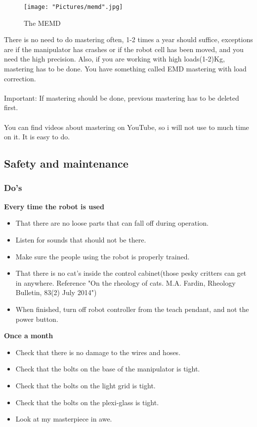 \documentclass{article}
\begin{document}
        \begin{figure}[!h]
            \centering
            \texttt{[image: "Pictures/memd".jpg]}
            \caption{The MEMD}
        \end{figure}
        
        There is no need to do mastering often, 1-2 times a year should suffice, exceptions are if the manipulator has crashes or if the robot cell has been moved, and you need the high precision. Also, if you are working with high loads(1-2)Kg, mastering has to be done. You have something called EMD mastering with load correction. 
        \\\\
        Important: If mastering should be done, previous mastering has to be deleted first. 
        \\\\
        You can find videos about mastering on YouTube, so i will not use to much time on it. It is easy to do. 
        
        \newpage

    \subsection{Safety and maintenance}
        \subsubsection{Do's }
        \textbf{Every time the robot is used}
        \begin{itemize}
            \item That there are no loose parts that can fall off during operation.
            \item Listen for sounds that should not be there.
            \item Make sure the people using the robot is properly trained.
            \item That there is no cat's inside the control cabinet(those pesky critters can get in anywhere. Reference "On the rheology of cats. M.A. Fardin, Rheology Bulletin, 83(2) July 2014")
            \item When finished, turn off robot controller from the teach pendant, and not the power button.
        \end{itemize}
        
        \textbf{Once a month}
        \begin{itemize}
            \item Check that there is no damage to the wires and hoses.
            \item Check that the bolts on the base of the manipulator is tight. 
            \item Check that the bolts on the light grid is tight.
            \item Check that the bolts on the plexi-glass is tight.
            \item Look at my masterpiece in awe.
        \end{itemize}
        
\end{document}
